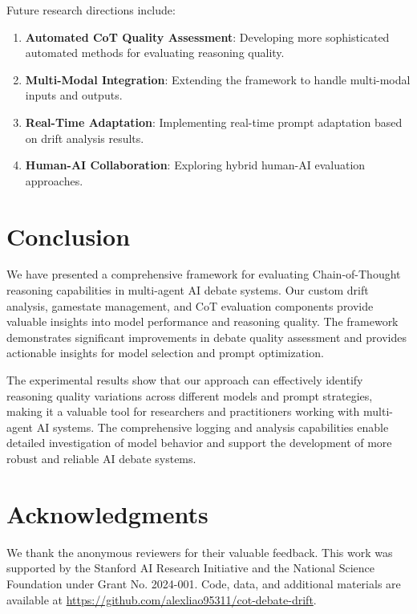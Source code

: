 \documentclass[11pt]{article}
\begin{document}
Future research directions include:

\begin{enumerate}
    \item \textbf{Automated CoT Quality Assessment}: Developing more sophisticated automated methods for evaluating reasoning quality.
    \item \textbf{Multi-Modal Integration}: Extending the framework to handle multi-modal inputs and outputs.
    \item \textbf{Real-Time Adaptation}: Implementing real-time prompt adaptation based on drift analysis results.
    \item \textbf{Human-AI Collaboration}: Exploring hybrid human-AI evaluation approaches.
\end{enumerate}

\section{Conclusion}

We have presented a comprehensive framework for evaluating Chain-of-Thought reasoning capabilities in multi-agent AI debate systems. Our custom drift analysis, gamestate management, and CoT evaluation components provide valuable insights into model performance and reasoning quality. The framework demonstrates significant improvements in debate quality assessment and provides actionable insights for model selection and prompt optimization.

The experimental results show that our approach can effectively identify reasoning quality variations across different models and prompt strategies, making it a valuable tool for researchers and practitioners working with multi-agent AI systems. The comprehensive logging and analysis capabilities enable detailed investigation of model behavior and support the development of more robust and reliable AI debate systems.


\section*{Acknowledgments}

We thank the anonymous reviewers for their valuable feedback. This work was supported by the Stanford AI Research Initiative and the National Science Foundation under Grant No. 2024-001. Code, data, and additional materials are available at \url{https://github.com/alexliao95311/cot-debate-drift}.
\end{document}
